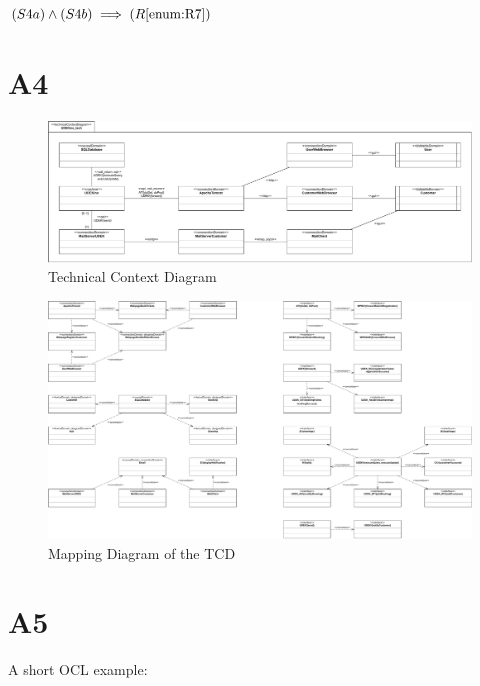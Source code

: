 \documentclass[a4paper,10pt,titlepage,bibtotoc,bibtotocnumbered]{scrreprt}
\begin{document}
$(S4a) \land (S4b) \implies (R\ref{enum:R7})$

\newpage\section{A4}

\begin{figure}[H]
    \centering
    \includegraphics[width = \textwidth]{figures/06/a06_technical_context_diagram-TCD.pdf}
    \caption{Technical Context Diagram}
    \label{figure:tcd}
\end{figure}

\begin{figure}[H]
    \centering
    \includegraphics[width = \textwidth]{figures/06/a06_technical_context_diagram-Mapping.pdf}
    \caption{Mapping Diagram of the TCD}
    \label{figure:tcd_md}
\end{figure}

\newpage\section{A5}
A short OCL example:\\
\lstset{language=OCL}          %
\end{document}
